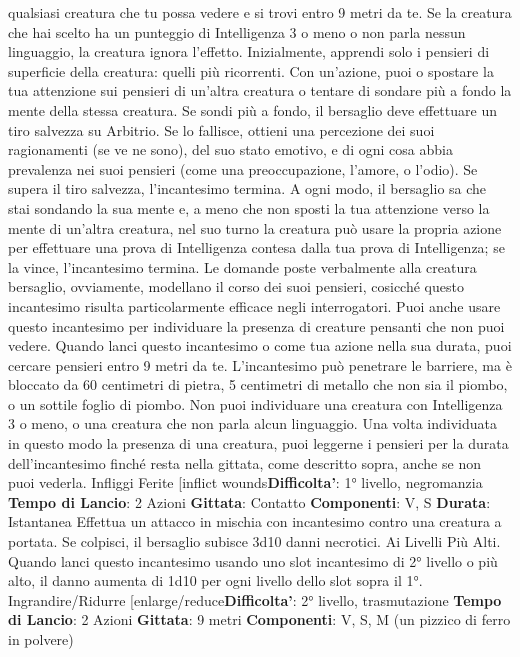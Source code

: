 \begin{multicols}{2}
qualsiasi creatura che tu possa vedere e si trovi entro 9
metri da te. Se la creatura che hai scelto ha un
punteggio di Intelligenza 3 o meno o non parla nessun
linguaggio, la creatura ignora l’effetto.
Inizialmente, apprendi solo i pensieri di superficie della
creatura: quelli più ricorrenti. Con un’azione, puoi o
spostare la tua attenzione sui pensieri di un’altra
creatura o tentare di sondare più a fondo la mente della
stessa creatura. Se sondi più a fondo, il bersaglio deve
effettuare un tiro salvezza su Arbitrio. Se lo fallisce,
ottieni una percezione dei suoi ragionamenti (se ve ne
sono), del suo stato emotivo, e di ogni cosa abbia
prevalenza nei suoi pensieri (come una
preoccupazione, l’amore, o l’odio). Se supera il tiro
salvezza, l’incantesimo termina. A ogni modo, il
bersaglio sa che stai sondando la sua mente e, a meno
che non sposti la tua attenzione verso la mente di
un’altra creatura, nel suo turno la creatura può usare la
propria azione per effettuare una prova di Intelligenza
contesa dalla tua prova di Intelligenza; se la vince,
l’incantesimo termina.
Le domande poste verbalmente alla creatura bersaglio,
ovviamente, modellano il corso dei suoi pensieri,
cosicché questo incantesimo risulta particolarmente
efficace negli interrogatori.
Puoi anche usare questo incantesimo per individuare la
presenza di creature pensanti che non puoi vedere.
Quando lanci questo incantesimo o come tua azione
nella sua durata, puoi cercare pensieri entro 9 metri da
te. L’incantesimo può penetrare le barriere, ma è
bloccato da 60 centimetri di pietra, 5 centimetri di
metallo che non sia il piombo, o un sottile foglio di
piombo. Non puoi individuare una creatura con
Intelligenza 3 o meno, o una creatura che non parla
alcun linguaggio.
Una volta individuata in questo modo la presenza di
una creatura, puoi leggerne i pensieri per la durata
dell’incantesimo finché resta nella gittata, come
descritto sopra, anche se non puoi vederla.
Infliggi Ferite
[inflict wounds\textbf{Difficolta'}:
1° livello, negromanzia
\textbf{Tempo di Lancio}: 2 Azioni
\textbf{Gittata}: Contatto
\textbf{Componenti}: V, S
\textbf{Durata}: Istantanea
Effettua un attacco in mischia con incantesimo contro
una creatura a portata. Se colpisci, il bersaglio subisce
3d10 danni necrotici.
Ai Livelli Più Alti. Quando lanci questo incantesimo
usando uno slot incantesimo di 2° livello o più alto, il
danno aumenta di 1d10 per ogni livello dello slot sopra
il 1°.
Ingrandire/Ridurre
[enlarge/reduce\textbf{Difficolta'}:
2° livello, trasmutazione
\textbf{Tempo di Lancio}: 2 Azioni
\textbf{Gittata}: 9 metri
\textbf{Componenti}: V, S, M (un pizzico di ferro in polvere)

\end{multicols}
